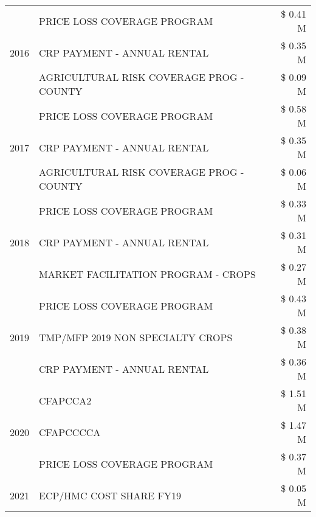 \begin{tabular}{llr}
\cline{1-3}
\multirow[t]{3}{*}{2016} & PRICE LOSS COVERAGE PROGRAM                   & \$ 0.41 M \\
 & CRP PAYMENT - ANNUAL RENTAL                   & \$ 0.35 M \\
 & AGRICULTURAL RISK COVERAGE PROG - COUNTY      & \$ 0.09 M \\
\cline{1-3}
\multirow[t]{3}{*}{2017} & PRICE LOSS COVERAGE PROGRAM & \$ 0.58 M \\
 & CRP PAYMENT - ANNUAL RENTAL & \$ 0.35 M \\
 & AGRICULTURAL RISK COVERAGE PROG - COUNTY & \$ 0.06 M \\
\cline{1-3}
\multirow[t]{3}{*}{2018} & PRICE LOSS COVERAGE PROGRAM & \$ 0.33 M \\
 & CRP PAYMENT - ANNUAL RENTAL & \$ 0.31 M \\
 & MARKET FACILITATION PROGRAM - CROPS & \$ 0.27 M \\
\cline{1-3}
\multirow[t]{3}{*}{2019} & PRICE LOSS COVERAGE PROGRAM & \$ 0.43 M \\
 & TMP/MFP 2019 NON SPECIALTY CROPS & \$ 0.38 M \\
 & CRP PAYMENT - ANNUAL RENTAL & \$ 0.36 M \\
\cline{1-3}
\multirow[t]{3}{*}{2020} & CFAPCCA2 & \$ 1.51 M \\
 & CFAPCCCCA & \$ 1.47 M \\
 & PRICE LOSS COVERAGE PROGRAM & \$ 0.37 M \\
\cline{1-3}
2021 & ECP/HMC COST SHARE FY19 & \$ 0.05 M \\
\cline{1-3}
\bottomrule
\end{tabular}
